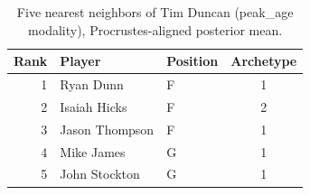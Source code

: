 \begin{table}[htbp]
  \centering\small
  \begin{tabular}{rllc}
    \toprule
    Rank & Player & Position & Archetype \\
    \midrule
    1 & Ryan Dunn & F & 1 \\
    2 & Isaiah Hicks & F & 2 \\
    3 & Jason Thompson & F & 1 \\
    4 & Mike James & G & 1 \\
    5 & John Stockton & G & 1 \\
    \bottomrule
  \end{tabular}
  \caption{Five nearest neighbors of Tim Duncan (peak_age modality), Procrustes-aligned posterior mean.}
  \label{tab:Tim_Duncan_neighbors_peak_age}
\end{table}

